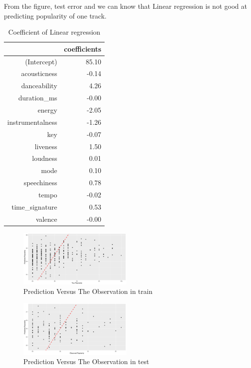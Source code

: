 \documentclass[conference]{IEEEtran}
\begin{document}
From the figure, test error and we can know that Linear regression is not good at predicting popularity of one track. 

\begin{table}[ht]
\centering
\caption{Coefficient of Linear regression}
\begin{tabular}{rr}
  \hline
 & coefficients \\ 
  \hline
(Intercept) & 85.10 \\ 
  acousticness & -0.14 \\ 
  danceability & 4.26 \\ 
  duration\_ms & -0.00 \\ 
  energy & -2.05 \\ 
  instrumentalness & -1.26 \\ 
  key & -0.07 \\ 
  liveness & 1.50 \\ 
  loudness & 0.01 \\ 
  mode & 0.10 \\ 
  speechiness & 0.78 \\ 
  tempo & -0.02 \\ 
  time\_signature & 0.53 \\ 
  valence & -0.00 \\ 
   \hline
\end{tabular}
\label{Coefficient of Linear regression}		
\end{table}

\begin{figure}[htbp]
\centerline{\includegraphics[width=0.5\textwidth]{figure/predict_and_observe_plot.pdf}}
\caption{Prediction Versus The Observation in train}
\label{Prediction Versus The Observation in train}
\end{figure}


\begin{figure}[htbp]
\centerline{\includegraphics[width=0.5\textwidth]{figure/testerror.pdf}}
\caption{Prediction Versus The Observation in test}
\label{Prediction Versus The Observation in test}
\end{figure}
\end{document}

